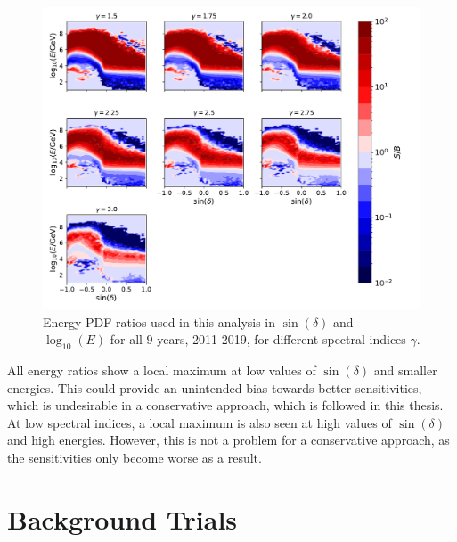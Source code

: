 \begin{figure}
    \centering
    \includegraphics[width=\linewidth]{Plots/05_csky/energy_pdf_ratio.pdf}
    \caption{Energy PDF ratios used in this analysis in $\sin{(\delta)}$ and $\log_{10}{(E)}$ for all $\num{9}$ years, 2011-2019, for different spectral indices $\gamma$.}
    \label{fig:energy_ratio_time_int}
\end{figure}

All energy ratios show a local maximum at low values of $\sin{(\delta)}$ and smaller energies.
This could provide an unintended bias towards better sensitivities, which is undesirable in a conservative approach, which is followed in this thesis.
At low spectral indices, a local maximum is also seen at high values of $\sin{(\delta)}$ and high energies.
However, this is not a problem for a conservative approach, as the sensitivities only become worse as a result.

\section{Background Trials}

